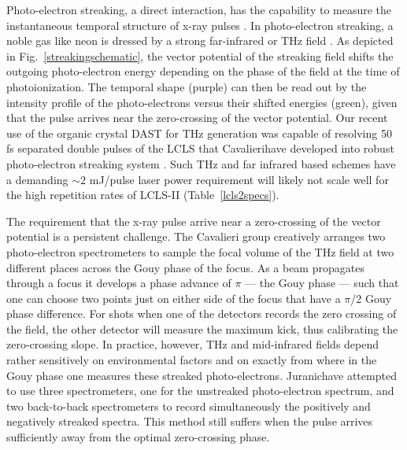 Photo-electron streaking, a direct interaction, has the capability to measure the instantaneous temporal structure of x-ray pulses \cite{Hentschel2001}.
In photo-electron streaking, a noble gas like neon is dressed by a strong far-infrared or THz field \cite{Helml2014,Juranic2014,Schulz2015}.
As depicted in Fig.~\ref{streakingschematic}, the vector potential of the streaking field shifts the outgoing photo-electron energy depending on the phase of the field at the time of photoionization.
The temporal shape (purple) can then be read out by the intensity profile of the photo-electrons versus their shifted energies (green), given that the pulse arrives near the zero-crossing of the vector potential.
Our recent use of the organic crystal DAST \cite{DAST} for THz generation was capable of resolving 50 fs separated double pulses of the LCLS \cite{Matthias2016} that Cavalieri\etal have developed into robust photo-electron streaking system \cite{Schulz2015}.
Such THz and far infrared based schemes \cite{Helml2014,Juranic2014} have a demanding $\sim$2 mJ/pulse laser power requirement will likely not scale well for the high repetition rates of LCLS-II (Table~\ref{lcls2specs}).

The requirement that the x-ray pulse arrive near a zero-crossing of the vector potential is a persistent challenge.
The Cavalieri group creatively arranges two photo-electron spectrometers to sample the focal volume of the THz field at two different places across the Gouy phase of the focus.
As a beam propagates through a focus it develops a phase advance of $\pi$ --- the Gouy phase --- such that one can choose two points just on either side of the focus that have a $\pi$/2 Gouy phase difference.
For shots when one of the detectors records the zero crossing of the field, the other detector will measure the maximum kick, thus calibrating the zero-crossing slope.
In practice, however, THz and mid-infrared fields depend rather sensitively on environmental factors and on exactly from where in the Gouy phase one measures these streaked photo-electrons.
Juranic\etal have attempted to use three spectrometers, one for the unstreaked photo-electron spectrum, and two back-to-back spectrometers to record simultaneously the positively and negatively streaked spectra.
This method still suffers when the pulse arrives sufficiently away from the optimal zero-crossing phase.




